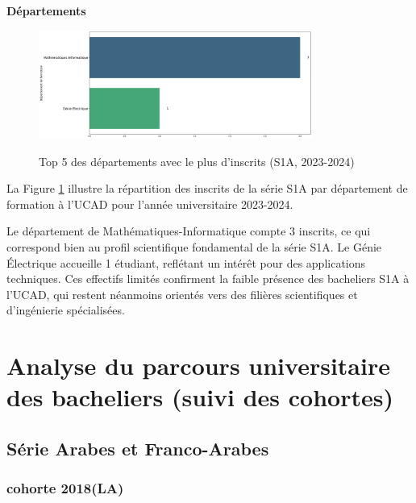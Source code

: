 \newpage
\textbf{Départements}

\begin{figure}[ht]
\centering
\caption{Top 5 des départements avec le plus d'inscrits (S1A, 2023-2024)}
\includegraphics[width=0.8\textwidth]{figure/dep_S1A_2024.png}
\label{fig:dep_s1a_2024}
\end{figure}

La Figure \ref{fig:dep_s1a_2024} illustre la répartition des inscrits de la série S1A par département de formation à l'UCAD pour l'année universitaire 2023-2024.

Le département de Mathématiques-Informatique compte 3 inscrits, ce qui correspond bien au profil scientifique fondamental de la série S1A. Le Génie Électrique accueille 1 étudiant, reflétant un intérêt pour des applications techniques. 
Ces effectifs limités confirment la faible présence des bacheliers S1A à l’UCAD, qui restent néanmoins orientés vers des filières scientifiques et d’ingénierie spécialisées.

\newpage
\section{Analyse du parcours universitaire des bacheliers (suivi des cohortes)}

\subsection{Série Arabes et Franco-Arabes}
\subsubsection{cohorte 2018(LA)}

